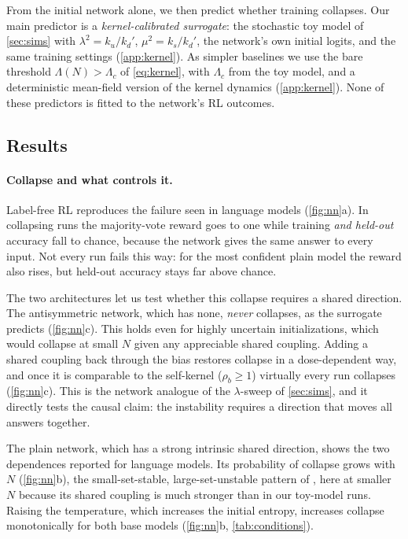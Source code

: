 From the initial network alone, we then predict whether training collapses.
Our main predictor is a \emph{kernel-calibrated surrogate}: the stochastic toy model of \cref{sec:sims} with $\lambda^2=k_u/k_d'$, $\mu^2=k_s/k_d'$, the network's own initial logits, and the same training settings (\cref{app:kernel}).
As simpler baselines we use the bare threshold $\Lambda(N)>\Lambda_c$ of \cref{eq:kernel}, with $\Lambda_c$ from the toy model, and a deterministic mean-field version of the kernel dynamics (\cref{app:kernel}).
None of these predictors is fitted to the network's RL outcomes.

\subsection{Results}
\label{sec:nnresults}

\paragraph{Collapse and what controls it.}
Label-free RL reproduces the failure seen in language models (\cref{fig:nn}a). In collapsing runs the majority-vote reward goes to one while training \emph{and held-out} accuracy fall to chance, because the network gives the same answer to every input.
Not every run fails this way: for the most confident plain model the reward also rises, but held-out accuracy stays far above chance.

The two architectures let us test whether this collapse requires a shared direction.
The antisymmetric network, which has none, \emph{never} collapses, as the surrogate predicts (\cref{fig:nn}c). This holds even for highly uncertain initializations, which would collapse at small $N$ given any appreciable shared coupling.
Adding a shared coupling back through the bias restores collapse in a dose-dependent way, and once it is comparable to the self-kernel ($\rho_b\ge1$) virtually every run collapses (\cref{fig:nn}c).
This is the network analogue of the $\lambda$-sweep of \cref{sec:sims}, and it directly tests the causal claim: the instability requires a direction that moves all answers together.

The plain network, which has a strong intrinsic shared direction, shows the two dependences reported for language models.
Its probability of collapse grows with $N$ (\cref{fig:nn}b), the small-set-stable, large-set-unstable pattern of \citet{he2026urlvr}, here at smaller $N$ because its shared coupling is much stronger than in our toy-model runs.
Raising the temperature, which increases the initial entropy, increases collapse monotonically for both base models (\cref{fig:nn}b, \cref{tab:conditions}).

